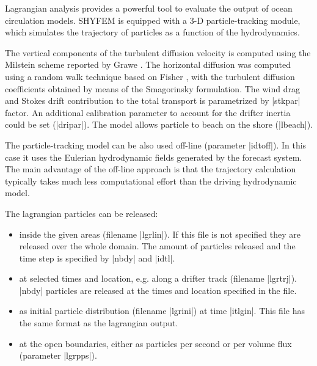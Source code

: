 
%
%
%
%
%
%
%

Lagrangian analysis provides a powerful tool to evaluate the output
of ocean circulation models. SHYFEM is equipped with a 3-D 
particle-tracking module, which simulates the trajectory of 
particles as a function of the hydrodynamics. 

The vertical components of the turbulent diffusion velocity is
computed using the Milstein scheme reported by Grawe 
\cite{Grawe2010}. The horizontal diffusion was computed using a 
random walk technique based on Fisher \cite{Fisher1979}, with the 
turbulent diffusion coefficients obtained by means of the 
Smagorinsky \cite{Smagorinsky1993} formulation. The wind drag 
and Stokes drift contribution to the total transport is parametrized
by |stkpar| factor. An additional calibration parameter to account
for the drifter inertia could be set (|dripar|). The model allows
particle to beach on the shore (|lbeach|). 

The particle-tracking model can be also used off-line (parameter
|idtoff|). In this case it uses the Eulerian hydrodynamic fields 
generated by the forecast system. The main advantage of the 
off-line approach is that the trajectory calculation typically 
takes much less computational effort than the driving hydrodynamic 
model.

The lagrangian particles can be released:
\begin{itemize}
\item inside the given areas (filename |lgrlin|). If this file is not 
      specified they are released over the whole domain. The amount of
      particles released and the time step is specified by |nbdy| and 
      |idtl|.
\item at selected times and location, e.g. along a drifter track
      (filename |lgrtrj|). |nbdy| particles are released at the times
      and location specified in the file.
\item as initial particle distribution (filename |lgrini|) at time
      |itlgin|. This file has the same format as the lagrangian output.
\item at the open boundaries, either as particles per second or per
      volume flux (parameter |lgrpps|).
\end{itemize}

